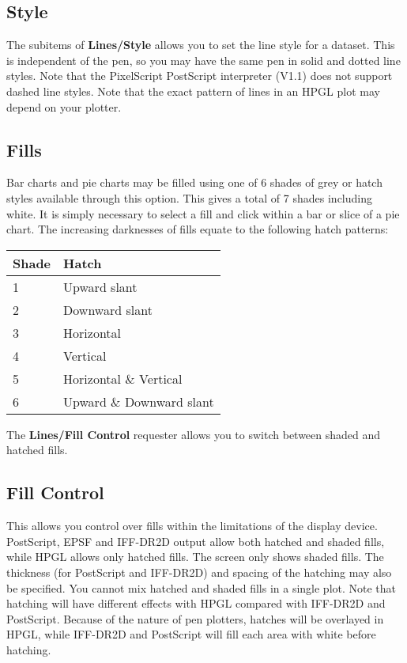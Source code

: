 \subsection{Style}
The subitems of {\bf Lines/Style}  allows you to set the line 
style for a dataset. This is independent 
of the pen, so you may have the same pen in solid and dotted line styles. Note 
that the PixelScript PostScript interpreter (V1.1) does not support dashed line 
styles. Note that the exact pattern of lines in an HPGL plot may depend on your 
plotter.


\subsection{Fills}
\label{ss:fill}
Bar charts  and pie charts  may be filled 
using one of 6 shades of grey or hatch styles available 
through this option. This gives a total of 7 shades including white. It is simply 
necessary to select a fill and click within a bar or slice of a pie chart. The 
increasing darknesses  of fills equate to the following hatch patterns:
\begin{center}
\begin{tabular}{|l|l|} \hline
Shade &  Hatch                      \\ \hline
1     &  Upward slant               \\
2     &  Downward slant             \\
3     &  Horizontal                 \\
4     &  Vertical                   \\
5     &  Horizontal \& Vertical     \\
6     &  Upward \& Downward slant   \\ \hline
\end{tabular}
\end{center}
The {\bf Lines/Fill Control} requester allows you to switch between shaded and 
hatched fills.


\subsection{Fill Control}
This allows you control over fills within the 
limitations of the display 
device. PostScript, EPSF and IFF-DR2D output allow both hatched and 
shaded fills, while HPGL allows only hatched fills. The screen only shows 
shaded fills. The thickness (for PostScript and IFF-DR2D) and spacing of 
the hatching may also be specified. You cannot mix hatched and shaded fills in a 
single plot. Note that hatching will have different effects with HPGL compared with 
IFF-DR2D and PostScript. Because of the nature of pen plotters, hatches will be 
overlayed in HPGL, while IFF-DR2D and PostScript will fill each area with white 
before hatching.


